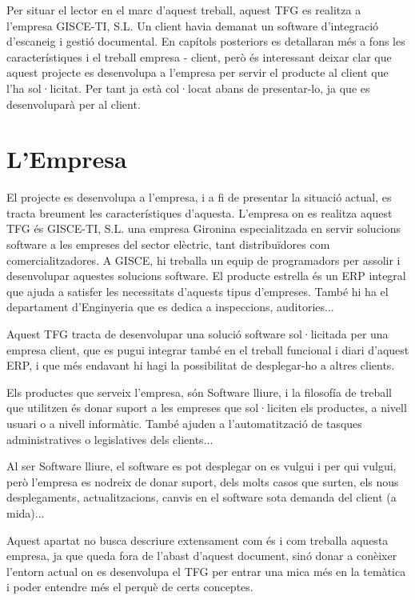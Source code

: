 \documentclass[letterpaper,11pt,catalan]{sphinxmanual}
\begin{document}
Per situar el lector en el marc d'aquest treball, aquest TFG es realitza a l'empresa GISCE-TI, S.L.
Un client havia demanat un software d'integració d'escaneig i gestió documental. En capítols posteriors
es detallaran més a fons les característiques i el treball empresa - client, però és interessant
deixar clar que aquest projecte es desenvolupa a l'empresa per servir el producte al client
que l'ha sol·licitat. Per tant ja està \sphinxquotedblleft{}col·locat\sphinxquotedblright{} abans de presentar-lo, ja que es desenvoluparà
per al client.


\section{L'Empresa}
\label{\detokenize{index:l-empresa}}
El projecte es desenvolupa a l'empresa, i a fi de presentar la situació actual, es tracta breument
les característiques d'aquesta.
L'empresa on es realitza aquest TFG és GISCE-TI, S.L. una empresa Gironina especialitzada en
servir solucions software a les empreses del sector elèctric, tant distribuïdores com comercialitzadores.
A GISCE, hi treballa un equip de programadors per assolir i desenvolupar aquestes solucions
software. El producte estrella és un ERP integral que ajuda a satisfer les necessitats d'aquests
tipus d'empreses. També hi ha el departament d'Enginyeria que es dedica a inspeccions, auditories...

Aquest TFG tracta de desenvolupar una solució software sol·licitada per una empresa client, que es pugui
integrar també en el treball funcional i diari d'aquest ERP, i que més endavant hi hagi
la possibilitat de desplegar-ho a altres clients.

Els productes que serveix l'empresa, són Software lliure, i la filosofía de treball que
utilitzen és donar suport a les empreses que sol·liciten els productes, a nivell usuari o
a nivell informàtic. També ajuden a l'automatització de tasques administratives o legislatives
dels clients...

Al ser Software lliure, el software es pot desplegar on es vulgui i per qui vulgui, però l'empresa
es nodreix de donar suport, dels molts casos que surten, els nous desplegaments, actualitzacions,
canvis en el software sota demanda del client (a mida)...

Aquest apartat no busca descriure extensament com és i com treballa aquesta empresa, ja que queda fora de l'abast d'aquest document,
sinó donar a conèixer l'entorn actual on es desenvolupa el TFG per entrar una mica més
en la temàtica i poder entendre més el perquè de certs conceptes.
\end{document}
